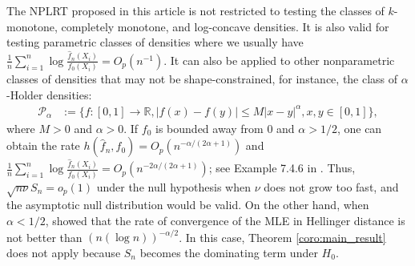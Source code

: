 \documentclass[12pt,letterpaper, twoside, openany]{article}
\theoremstyle{plain}
\begin{document}
The NPLRT proposed in this article is not restricted to testing the classes of $k$-monotone, completely monotone, and log-concave densities. It is also valid for testing parametric classes of densities where we usually have $\frac{1}{n} \sum^n_{i=1} \log \frac{\hat{f}_n(X_i)}{f_0(X_i)} = O_p(n^{-1})$. It can also be applied to other nonparametric classes of densities that may not be shape-constrained, for instance, the class of $\alpha$-Holder densities:
		\begin{align*}
			\mathcal{P}_\alpha &:= \{f:[0, 1] \rightarrow \mathbb{R}, |f(x) - f(y)| \leq M |x  - y|^\alpha, x,y \in [0,1] \},
		\end{align*}
		where $M > 0$ and $\alpha > 0$. If $f_0$ is bounded away from $0$ and $\alpha > 1/2$, one can obtain the rate $h(\hat{f}_n, f_0) = O_p(n^{-\alpha/(2\alpha + 1)})$ and $\frac{1}{n} \sum^n_{i=1} \log \frac{\hat{f}_n(X_i)}{f_0(X_i)} = O_p(n^{-2\alpha/(2\alpha + 1)})$; see Example 7.4.6 in \cite{van2000empirical}. Thus, $\sqrt{n\nu} S_{n}=o_p(1)$ under the null hypothesis when $\nu$ does not grow too fast, and the asymptotic null distribution would be valid.
		On the other hand, when $\alpha < 1/2$, \cite{birge1993rates} showed that the rate of convergence of the MLE in Hellinger distance is not better than $(n(\log n))^{-\alpha/2}$. In this case, Theorem \ref{coro:main_result} does not apply because $S_{n}$ becomes the dominating term under $H_0$.
		
\end{document}
